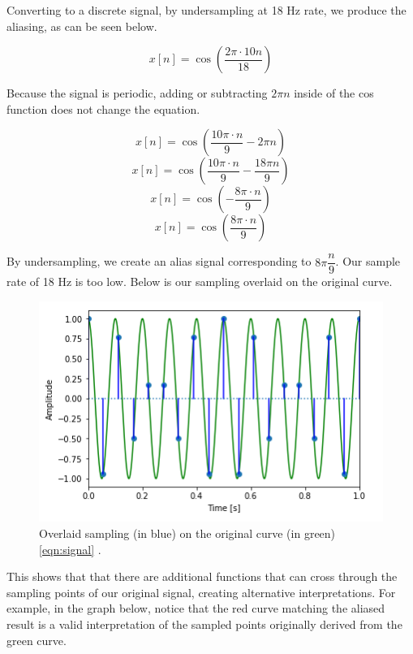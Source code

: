 Converting to a discrete signal, by undersampling at 18 Hz rate, we
produce the aliasing, as can be seen below.

\begin{equation}
	x[n]=\cos(\frac{2\pi \cdot 10n}{18})
\end{equation}

Because the signal is periodic, adding or subtracting $2\pi n$ 
inside of the cos function does not change the equation.

\begin{equation}
	x[n]=\cos(\frac{10\pi \cdot n}{9} - 2\pi n)
\end{equation}
\begin{equation}
	x[n]=\cos(\frac{10\pi \cdot n}{9} - \frac{18\pi n}{9})
\end{equation}
\begin{equation}
	x[n]=\cos(-\frac{8\pi\cdot n}{9})
\end{equation}
\begin{equation}
	x[n]=\cos(\frac{8\pi\cdot n}{9})
\end{equation}

By undersampling, we create an alias signal corresponding to
\(8\pi\dfrac{n}{9}\). Our sample rate of 18 Hz is too low. Below
is our sampling overlaid on the original curve.

\begin{figure}[H]
	\centering
	\includegraphics[scale = 1]{images/sub_sample.png} %
	\caption{
		Overlaid sampling (in blue) on the original curve (in green) 
		\ref{eqn:signal} 
		\cite{notebook:sampling}.
	}
	\label{fig:sub_sample}
\end{figure}    

This shows that that there are additional functions that can cross
through the sampling points of our original signal, creating
alternative interpretations. For example, in the graph below,
notice that the red curve matching the aliased result is a valid
interpretation of the sampled points originally derived from the
green curve.

